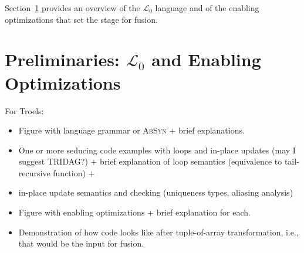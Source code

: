 \documentclass{sigplanconf}  %
\begin{document}
Section~\ref{sec:Prelim} provides an overview of the $\mathcal{L}_0$ language %
and of the enabling optimizations that set the stage for fusion. %







\section{Preliminaries: $\mathcal{L}_0$ and Enabling Optimizations}
\label{sec:Prelim}

For Troels:
\begin{itemize}
    \item[1.] Figure with language grammar or \textsc{AbSyn} $+$ brief explanations.
    \item[2.] One or more seducing code examples with loops and in-place updates (may I suggest TRIDAG?) 
                $+$ brief explanation of loop semantics (equivalence to tail-recursive function) $+$
    \item[3.] in-place update semantics and checking (uniqueness types, aliasing analysis)
    \item[4.] Figure with enabling optimizations $+$ brief explanation for each.
    \item[5.] Demonstration of how code looks like after tuple-of-array transformation,
                i.e., that would be the input for fusion.
\end{itemize}
\end{document}
